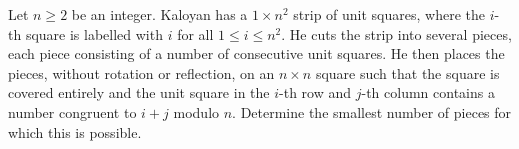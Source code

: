 Let $n \geq 2$ be an integer.
Kaloyan has a $1 \times n^2$ strip of unit squares,
where the $i$-th square is labelled with $i$ for all $1 \leq i \leq n^2$.
He cuts the strip into several pieces, each piece consisting of a number of consecutive unit squares.
He then places the pieces, without rotation or reflection,
on an $n \times n$ square such that the square is covered entirely and
the unit square in the $i$-th row and $j$-th column contains a number congruent to $i + j$ modulo $n$. 
Determine the smallest number of pieces for which this is possible.
